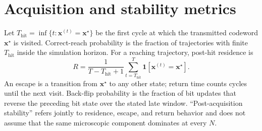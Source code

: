 \documentclass[aps,prapplied,reprint,superscriptaddress,longbibliography,floatfix]{revtex4-2}
\begin{document}
\section{Acquisition and stability metrics}
\label{app:metrics}

Let $T_{\mathrm{hit}}=\inf\{t:\bm{x}^{(t)}=\bm{x}^{\star}\}$ be the first cycle at which the transmitted codeword $\bm{x}^{\star}$ is visited.  Correct-reach probability is the fraction of trajectories with finite $T_{\mathrm{hit}}$ inside the simulation horizon.  For a reaching trajectory, post-hit residence is
\begin{equation}
R=\frac{1}{T-T_{\mathrm{hit}}+1}\sum_{t=T_{\mathrm{hit}}}^{T}
\mathbf{1}[\bm{x}^{(t)}=\bm{x}^{\star}].
\end{equation}
An escape is a transition from $\bm{x}^{\star}$ to any other state; return time counts cycles until the next visit.  Back-flip probability is the fraction of bit updates that reverse the preceding bit state over the stated late window.  ``Post-acquisition stability'' refers jointly to residence, escape, and return behavior and does not assume that the same microscopic component dominates at every $N$.


\end{document}
